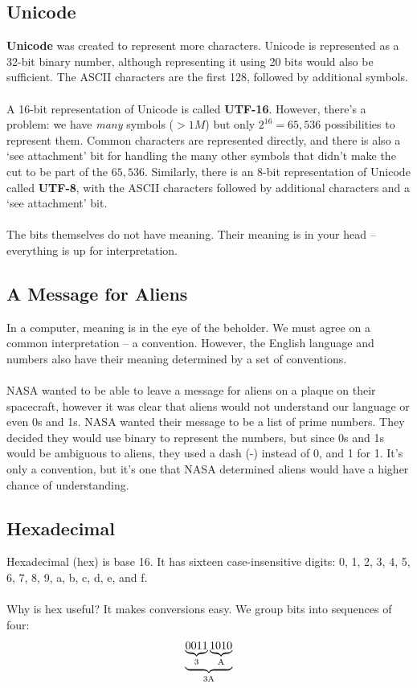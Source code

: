 \documentclass[]{article}
\theoremstyle{definition}
\newcommand{\lecture}[1]{\marginpar{{\footnotesize $\leftarrow$ \underline{#1}}}}
\begin{document}
		\subsection{Unicode}
			\textbf{Unicode} was created to represent more characters. Unicode is represented as a 32-bit binary number, although representing it using 20 bits would also be sufficient. The ASCII characters are the first 128, followed by additional symbols.
			\\ \\
			A 16-bit representation of Unicode is called \textbf{UTF-16}. However, there's a problem: we have \emph{many} symbols ($> 1M$) but only $2^16 = 65,536$ possibilities to represent them. Common characters are represented directly, and there is also a `see attachment' bit for handling the many other symbols that didn't make the cut to be part of the $65,536$. Similarly, there is an 8-bit representation of Unicode called \textbf{UTF-8}, with the ASCII characters followed by additional characters and a `see attachment' bit.
			\\ \\
			The bits themselves do not have meaning. Their meaning is in your head -- everything is up for interpretation.
		\subsection{A Message for Aliens} \lecture{January 9, 2013}
			In a computer, meaning is in the eye of the beholder. We must agree on a common interpretation -- a convention. However, the English language and numbers also have their meaning determined by a set of conventions.
			\\ \\
			NASA wanted to be able to leave a message for aliens on a plaque on their spacecraft, however it was clear that aliens would not understand our language or even 0s and 1s. NASA wanted their message to be a list of prime numbers. They decided they would use binary to represent the numbers, but since 0s and 1s would be ambiguous to aliens, they used a dash (-) instead of 0, and 1 for 1. It's only a convention, but it's one that NASA determined aliens would have a higher chance of understanding.
		\subsection{Hexadecimal}
			Hexadecimal (hex) is base 16. It has sixteen case-insensitive digits: 0, 1, 2, 3, 4, 5, 6, 7, 8, 9, a, b, c, d, e, and f.
			\\ \\
			Why is hex useful? It makes conversions easy. We group bits into sequences of four:
			\begin{align*}
			  \underbrace{\underbrace{0011}_{3} \underbrace{1010}_{\text A}}_{\text{3A}}
			\end{align*}
\end{document}
